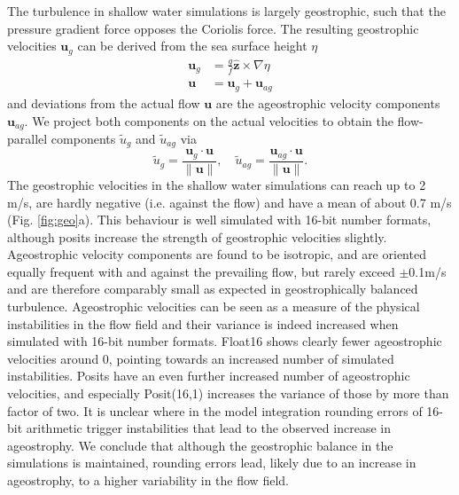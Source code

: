 \documentclass[draft]{agujournal2019}
\begin{document}
The turbulence in shallow water simulations is largely geostrophic, such that the pressure gradient force opposes the Coriolis force. The resulting geostrophic velocities $\mathbf{u}_g$ can be derived from the sea surface height $\eta$
\begin{subequations}
\begin{align}
\mathbf{u}_g &= \frac{g}{f}\hat{\mathbf{z}} \times \nabla \eta \\
\mathbf{u} &= \mathbf{u}_{g} + \mathbf{u}_{ag}
\end{align}
\label{eq:geo}%
\end{subequations}
and deviations from the actual flow $\mathbf{u}$ are the ageostrophic velocity components $\mathbf{u}_{ag}$. We project both components on the actual velocities to obtain the flow-parallel components $\tilde{u}_{g}$ and $\tilde{u}_{ag}$ via
\begin{equation}
\tilde{u}_g = \frac{\mathbf{u}_g \cdot \mathbf{u}}{\| \mathbf{u} \|}, \quad \tilde{u}_{ag} = \frac{\mathbf{u}_{ag} \cdot \mathbf{u}}{\| \mathbf{u} \|}.
\label{eq:parallel}%
\end{equation}
The geostrophic velocities in the shallow water simulations can reach up to 2 m/s, are hardly negative (i.e. against the flow) and have a mean of about 0.7 m/s (Fig. \ref{fig:geo}a). This behaviour is well simulated with 16-bit number formats, although posits increase the strength of geostrophic velocities slightly. Ageostrophic velocity components are found to be isotropic, and are oriented equally frequent with and against the prevailing flow, but rarely exceed $\pm$0.1m/s and are therefore comparably small as expected in geostrophically balanced turbulence. Ageostrophic velocities can be seen as a measure of the physical instabilities in the flow field and their variance is indeed increased when simulated with 16-bit number formats. Float16 shows clearly fewer ageostrophic velocities around 0, pointing towards an increased number of simulated instabilities. Posits have an even further increased number of ageostrophic velocities, and especially Posit(16,1) increases the variance of those by more than factor of two. It is unclear where in the model integration rounding errors of 16-bit arithmetic trigger instabilities that lead to the observed increase in ageostrophy. We conclude that although the geostrophic balance in the simulations is maintained, rounding errors lead, likely due to an increase in ageostrophy, to a higher variability in the flow field.
\end{document}
